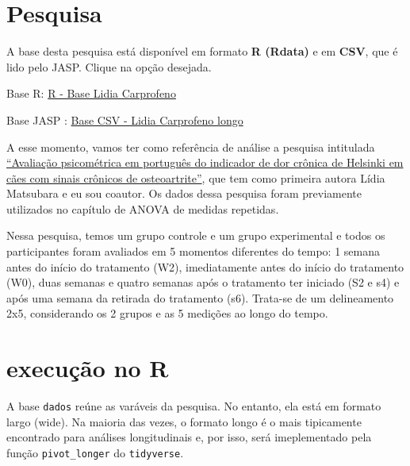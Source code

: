 \documentclass[
]{book}
\newenvironment{base}{
  \definecolor{shadecolor}{rgb}{0.972,0.972,0.972}  %
  \color{black}
  \begin{shaded}}
 {\end{shaded}}
\begin{document}
\hypertarget{pesquisa-7}{%
\section{Pesquisa}\label{pesquisa-7}}

\begin{base}
A base desta pesquisa está disponível em formato \textbf{R (Rdata)} e em \textbf{CSV}, que é lido pelo JASP. Clique na opção desejada.

Base R: \href{https://github.com/anovabr/mqt/raw/master/bases/R\%20-\%20Base\%20Lidia\%20Carprofeno.RData}{R - Base Lidia Carprofeno}

Base JASP : \href{https://github.com/anovabr/mqt/raw/master/bases/bases_csv_jasp.zip}{Base CSV - Lidia Carprofeno longo}

\end{base}

A esse momento, vamos ter como referência de análise a pesquisa intitulada \href{https://www.scielo.br/scielo.php?script=sci_arttext\&pid=S0102-09352019000100109}{``Avaliação psicométrica em português do indicador de dor crônica de Helsinki em cães com sinais crônicos de osteoartrite''}, que tem como primeira autora Lídia Matsubara e eu sou coautor. Os dados dessa pesquisa foram previamente utilizados no capítulo de ANOVA de medidas repetidas.

Nessa pesquisa, temos um grupo controle e um grupo experimental e todos os participantes foram avaliados em 5 momentos diferentes do tempo: 1 semana antes do início do tratamento (W2), imediatamente antes do início do tratamento (W0), duas semanas e quatro semanas após o tratamento ter iniciado (S2 e s4) e após uma semana da retirada do tratamento (s6). Trata-se de um delineamento 2x5, considerando os 2 grupos e as 5 medições ao longo do tempo.

\hypertarget{execuuxe7uxe3o-no-r-12}{%
\section{execução no R}\label{execuuxe7uxe3o-no-r-12}}

A base \texttt{dados} reúne as varáveis da pesquisa. No entanto, ela está em formato largo (wide). Na maioria das vezes, o formato longo é o mais tipicamente encontrado para análises longitudinais e, por isso, será imeplementado pela função \texttt{pivot\_longer} do \texttt{tidyverse}.
\end{document}
